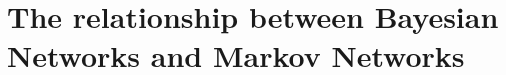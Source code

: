 \documentclass[11pt]{article}
\numberwithin{equation}{section}
\theoremstyle{boldStyle}
\theoremstyle{boldBlueStyle}
\theoremstyle{boldPurpleStyle}
\theoremstyle{boldRedStyle}
\begin{document}
\newpage
\section{The relationship between Bayesian Networks and Markov Networks}
\end{document}
